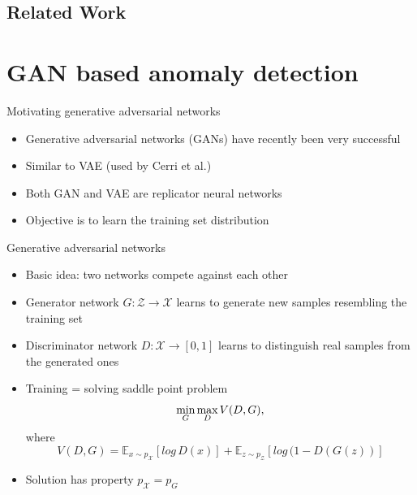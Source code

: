 \documentclass{beamer}
\begin{document}
\subsection{Related Work}

\section{GAN based anomaly detection}

\begin{frame}{Motivating generative adversarial networks}
  \begin{itemize}
      \item<1-> Generative adversarial networks (GANs) have recently been very successful
      \item<2-> Similar to VAE (used by Cerri et al.)
      \item<3-> Both GAN and VAE are replicator neural networks
      \item<4-> Objective is to learn the training set distribution
  \end{itemize}
\end{frame}

\begin{frame}{Generative adversarial networks}
  \begin{itemize}
      \item<1-> Basic idea: two networks compete against each other
      \item<2-> Generator network $G: \mathcal{Z} \rightarrow \mathcal{X}$ learns to generate new samples resembling the training set
      \item<3-> Discriminator network $D:\mathcal{X} \rightarrow [0,1]$ learns to distinguish real samples from the generated ones
      \item<4-> Training = solving saddle point problem
      \begin{equation}
      \underset{G}{\textup{min}}\, \underset{D}{\textup{max}}\, V(D,G),
      \end{equation}
      where
      \begin{equation}
        V(D,G)=\mathbb{E}_{x\sim p_\mathcal{X}}[log\,D(x)] + \mathbb{E}_{z\sim p_\mathcal{Z}}[log\,(1-D(G(z))]
      \end{equation}
      
      \item<5-> Solution has property $p_\mathcal{X}=p_G$
  \end{itemize}
\end{frame}
\end{document}
